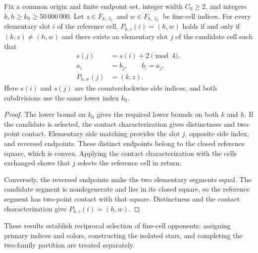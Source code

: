 \begin{lemma}
    \label{thm:area_law_reciprocal_elementary_opponents}
    \leanok
    Fix a common origin and finite endpoint set, integer width
    $C_0\ge2$, and integers $k,h\ge k_0\ge50\,000\,000$.
    Let $z\in F_{k,\ell_k}$ and $w\in F_{h,\ell_h}$ be
    fine-cell indices. For every elementary slot $i$ of
    the reference cell, $P_{k,z}(i)=(h,w)$ holds
    if and only if $(k,z)\ne(h,w)$ and there exists an
    elementary slot $j$ of the candidate cell such that
    \begin{align}
        s(j)       & =s(i)+2\pmod4,       \\
        a_i        & =b_j,\qquad b_i=a_j, \\
        P_{h,w}(j) & =(k,z).
    \end{align}
    Here $s(i)$ and $s(j)$ are the counterclockwise side indices,
    and both subdivisions use the same lower index $k_0$.
\end{lemma}
\begin{proof}\leanok
    The lower bound on $k_0$ gives the required lower bounds on
    both $k$ and $h$. If the candidate is selected,
    the contact characterization
    gives distinctness and two-point contact.
    Elementary side matching provides
    the slot $j$, opposite side index, and reversed endpoints.
    These distinct endpoints belong to the closed reference square,
    which is convex.
    Applying the contact characterization with
    the cells exchanged shows that $j$ selects the reference cell in return.

    Conversely, the reversed endpoints make the two elementary
    segments equal. The candidate segment is nondegenerate and
    lies in its closed square, so the reference segment has
    two-point contact with that square. Distinctness and
    the contact characterization give $P_{k,z}(i)=(h,w)$.
\end{proof}

These results establish reciprocal selection of fine-cell
opponents; assigning primary indices and colors, constructing the isolated
stars, and completing the two-family partition are treated separately.
